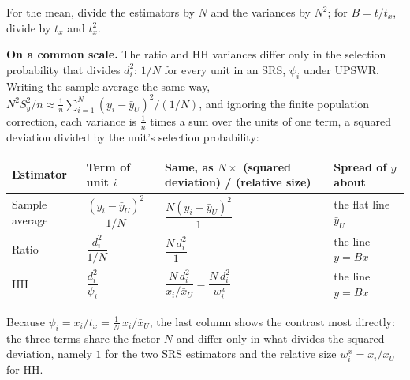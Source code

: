\documentclass[
  letterpaper,
  DIV=11,
  numbers=noendperiod]{scrreprt}
\newcounter{none} %
\renewcommand{\[}{\begin{equation}}
\renewcommand{\]}{\end{equation}}
\begin{document}
For the mean, divide the estimators by \(N\) and the variances by
\(N^2\); for \(B=t/t_x\), divide by \(t_x\) and \(t_x^2\).

\textbf{On a common scale.} The ratio and HH variances differ only in
the selection probability that divides \(d_i^2\): \(1/N\) for every unit
in an SRS, \(\psi_i\) under UPSWR. Writing the sample average the same
way, \(N^2S_y^2/n\approx\frac1n\sum_{i=1}^N(y_i-\bar{y}_U)^2/(1/N)\),
and ignoring the finite population correction, each variance is
\(\frac1n\) times a sum over the units of one term, a squared deviation
divided by the unit's selection probability:

{\def\LTcaptype{none} %
\begin{longtable}[]{@{}
  >{\raggedright\arraybackslash}p{}
  >{\raggedright\arraybackslash}p{}
  >{\raggedright\arraybackslash}p{}
  >{\raggedright\arraybackslash}p{}@{}}
\toprule\noalign{}
\begin{minipage}[b]{\linewidth}\raggedright
Estimator
\end{minipage} & \begin{minipage}[b]{\linewidth}\raggedright
Term of unit \(i\)
\end{minipage} & \begin{minipage}[b]{\linewidth}\raggedright
Same, as \(N\times\) (squared deviation) / (relative size)
\end{minipage} & \begin{minipage}[b]{\linewidth}\raggedright
Spread of \(y\) about
\end{minipage} \\
\midrule\noalign{}
\endhead
\bottomrule\noalign{}
\endlastfoot
Sample average & \(\dfrac{(y_i-\bar{y}_U)^2}{1/N}\) &
\(\dfrac{N(y_i-\bar{y}_U)^2}{1}\) & the flat line \(\bar{y}_U\) \\
Ratio & \(\dfrac{d_i^2}{1/N}\) & \(\dfrac{N\,d_i^2}{1}\) & the line
\(y=Bx\) \\
HH & \(\dfrac{d_i^2}{\psi_i}\) &
\(\dfrac{N\,d_i^2}{x_i/\bar{x}_U}=\dfrac{N\,d_i^2}{w^x_i}\) & the line
\(y=Bx\) \\
\end{longtable}
}

Because \(\psi_i=x_i/t_x=\frac1N\,x_i/\bar{x}_U\), the last column shows
the contrast most directly: the three terms share the factor \(N\) and
differ only in what divides the squared deviation, namely \(1\) for the
two SRS estimators and the relative size \(w^x_i=x_i/\bar{x}_U\) for HH.
\end{document}
